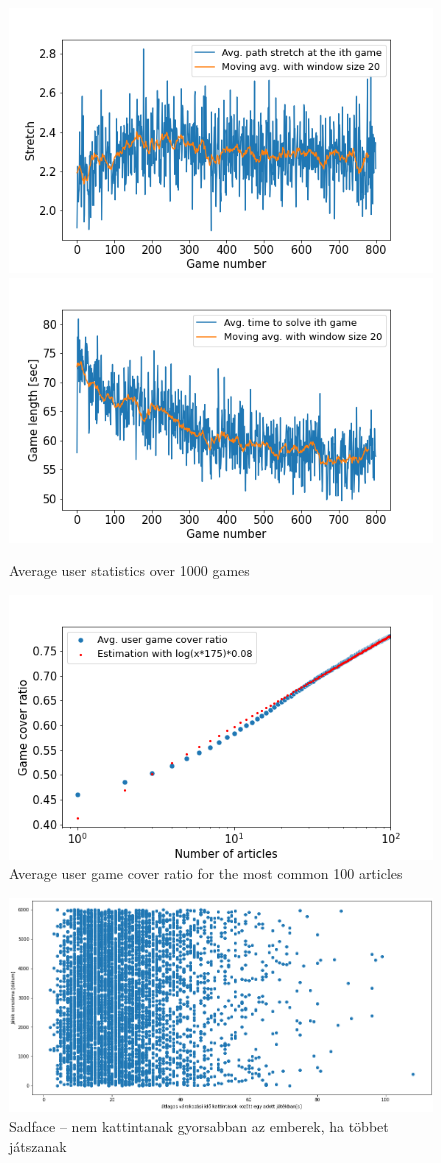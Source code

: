 \documentclass[fleqn,10pt]{wlscirep}
\begin{document}
\begin{figure}[H]
\centering
\includegraphics[width=0.45\linewidth]{figs/avg_stretch.png}
\includegraphics[width=0.45\linewidth]{figs/avg_game_length.png}
\caption{Average user statistics over 1000 games}
\label{fig:user_avg_stats}
\end{figure}

\begin{figure}[H]
\centering
\includegraphics[width=0.7\linewidth]{figs/avg_game_cover_ratio.png}
\caption{Average user game cover ratio for the most common 100 articles}
\label{fig:user_avg_game_cover}
\end{figure}

\begin{figure}[H]
\centering
\includegraphics[width=\linewidth]{figs/fig1.png}
\caption{Sadface -- nem kattintanak gyorsabban az emberek, ha többet játszanak}
\label{fig:user_avg_stats}
\end{figure}
\end{document}
